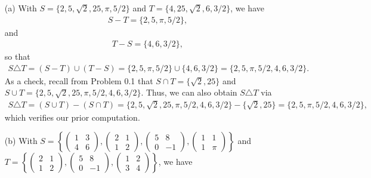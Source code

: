 \documentclass[12pt]{article}
\numberwithin{theorem}{section}
\numberwithin{equation}{section}
\numberwithin{remark}{section}
\numberwithin{definition}{section}
\numberwithin{theorem}{section}
\numberwithin{lemma}{section}
\numberwithin{example}{section}
\begin{document}
\begin{itemize}
	\item[(a)]{With $S = \{2,5,\sqrt{2},25,\pi,5/2\}$ and $T=\{4,25,\sqrt{2},6,3/2\}$, we have
		\begin{align*}
			S-T = \{2,5,\pi,5/2\},
		\end{align*}
		and
		\begin{align*}
			T-S = \{4,6,3/2\},
		\end{align*}
		so that 
		\begin{align*}
			S\triangle T = \left(S - T\right) \cup \left(T - S\right) = \{2,5,\pi,5/2\} \cup \{4,6,3/2\} = \{2,5,\pi,5/2,4,6,3/2\}.
		\end{align*}
		As a check, recall from Problem 0.1 that $S\cap T = \{\sqrt{2},25\}$ and $S\cup T = \{2,5,\sqrt{2},25,\pi,5/2,4,6,3/2\}$. Thus, we can also obtain $S\triangle T$ via
		\begin{align*}
			S\triangle T = \left(S \cup T\right) - \left(S \cap T\right)= \{2,5,\sqrt{2},25,\pi,5/2,4,6,3/2\} - \{\sqrt{2},25\} = \{2,5,\pi,5/2,4,6,3/2\},
		\end{align*}
		which verifies our prior computation.}
	\item[(b)]{With $S=\left\{\begin{pmatrix} 1 & 3 \\ 4 & 6 \end{pmatrix}, \begin{pmatrix} 2 & 1 \\ 1 & 2 \end{pmatrix}, \begin{pmatrix} 5 & 8 \\ 0 & -1 \end{pmatrix}, \begin{pmatrix} 1 & 1 \\ 1 & \pi \end{pmatrix}\right\}$ and $T=\left\{\begin{pmatrix} 2 & 1 \\ 1 & 2 \end{pmatrix}, \begin{pmatrix} 5 & 8 \\ 0 & -1 \end{pmatrix}, \begin{pmatrix} 1 & 2 \\ 3 & 4 \end{pmatrix}\right\}$, we have
		\begin{align*}

\end{align*}}
\end{itemize}
\end{document}
